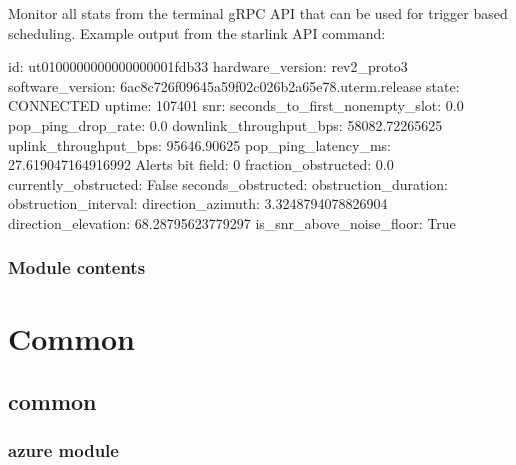 \documentclass[letterpaper,10pt,english]{sphinxmanual}
\begin{document}
\begin{fulllineitems}
\label{\detokenize{node:node.trigger.log}}
\pysigstartsignatures
{}
\pysigstopsignatures
\sphinxAtStartPar
Monitor all stats from the terminal gRPC API that can be used for
trigger based scheduling. Example output from the starlink API command:

\sphinxAtStartPar
id:                    ut01000000\sphinxhyphen{}00000000\sphinxhyphen{}001fdb33
hardware\_version:      rev2\_proto3
software\_version:      6ac8c726\sphinxhyphen{}f096\sphinxhyphen{}45a5\sphinxhyphen{}9f02\sphinxhyphen{}c026b2a65e78.uterm.release
state:                 CONNECTED
uptime:                107401
snr:
seconds\_to\_first\_nonempty\_slot: 0.0
pop\_ping\_drop\_rate:    0.0
downlink\_throughput\_bps: 58082.72265625
uplink\_throughput\_bps: 95646.90625
pop\_ping\_latency\_ms:   27.619047164916992
Alerts bit field:      0
fraction\_obstructed:   0.0
currently\_obstructed:  False
seconds\_obstructed:
obstruction\_duration:
obstruction\_interval:
direction\_azimuth:     \sphinxhyphen{}3.3248794078826904
direction\_elevation:   68.28795623779297
is\_snr\_above\_noise\_floor: True

\end{fulllineitems}



\subsection{Module contents}
\label{\detokenize{node:module-node}}\label{\detokenize{node:module-contents}}

\chapter{Common}
\label{\detokenize{modules:common}}
\sphinxstepscope


\section{common}
\label{\detokenize{common/modules:common}}\label{\detokenize{common/modules::doc}}
\sphinxstepscope


\subsection{azure module}
\label{\detokenize{common/azure:module-azure}}\label{\detokenize{common/azure:azure-module}}\label{\detokenize{common/azure::doc}}
\sphinxstepscope
\end{document}
